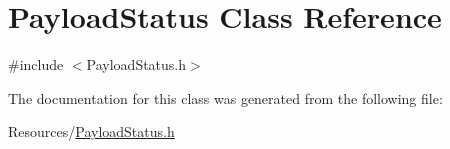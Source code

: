 \hypertarget{classPayloadStatus}{\section{Payload\-Status Class Reference}
\label{classPayloadStatus}
}


{\ttfamily \#include $<$Payload\-Status.\-h$>$}



The documentation for this class was generated from the following file\-:\begin{DoxyCompactItemize}
\item 
Resources/\hyperlink{PayloadStatus_8h}{Payload\-Status.\-h}\end{DoxyCompactItemize}

